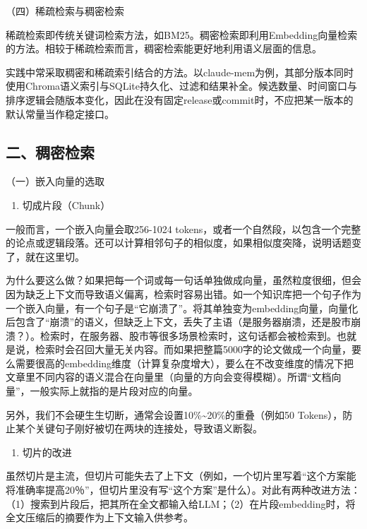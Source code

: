 （四）稀疏检索与稠密检索

稀疏检索即传统关键词检索方法，如BM25。稠密检索即利用Embedding向量检索的方法。相较于稀疏检索而言，稠密检索能更好地利用语义层面的信息。

实践中常采取稠密和稀疏索引结合的方法。以claude-mem为例，其部分版本同时使用Chroma语义索引与SQLite持久化、过滤和结果补全。候选数量、时间窗口与排序逻辑会随版本变化，因此在没有固定release或commit时，不应把某一版本的默认常量当作稳定接口。

\hypertarget{ux4e8cux7a20ux5bc6ux68c0ux7d22}{%
\subsection{二、稠密检索}\label{ux4e8cux7a20ux5bc6ux68c0ux7d22}}

（一）嵌入向量的选取

\begin{enumerate}
\def\labelenumi{\arabic{enumi}.}
\tightlist
\item
  切成片段（Chunk）
\end{enumerate}

一般而言，一个嵌入向量会取256-1024 tokens，或者一个自然段，以包含一个完整的论点或逻辑段落。还可以计算相邻句子的相似度，如果相似度突降，说明话题变了，就在这里切。

为什么要这么做？如果把每一个词或每一句话单独做成向量，虽然粒度很细，但会因为缺乏上下文而导致语义偏离，检索时容易出错。如一个知识库把一个句子作为一个嵌入向量，有一个句子是``它崩溃了''。将其单独变为embedding向量，向量化后包含了``崩溃''的语义，但缺乏上下文，丢失了主语（是服务器崩溃，还是股市崩溃？）。检索时，在服务器、股市等很多场景检索时，这句话都会被检索到。也就是说，检索时会召回大量无关内容。而如果把整篇5000字的论文做成一个向量，要么需要很高的embedding维度（计算复杂度增大），要么在不改变维度的情况下把文章里不同内容的语义混合在向量里（向量的方向会变得模糊）。所谓``文档向量''，一般实际上就指的是片段对应的向量。

另外，我们不会硬生生切断，通常会设置10\%\textasciitilde20\%的重叠（例如50 Tokens），防止某个关键句子刚好被切在两块的连接处，导致语义断裂。

\begin{enumerate}
\def\labelenumi{\arabic{enumi}.}
\setcounter{enumi}{1}
\tightlist
\item
  切片的改进
\end{enumerate}

虽然切片是主流，但切片可能失去了上下文（例如，一个切片里写着``这个方案能将准确率提高20％''，但切片里没有写``这个方案''是什么）。对此有两种改进方法：（1）搜索到片段后，把其所在全文都输入给LLM；（2）在片段embedding时，将全文压缩后的摘要作为上下文输入供参考。

